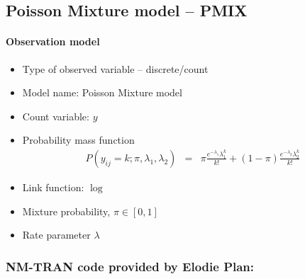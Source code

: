 \subsection{Poisson Mixture model -- PMIX}
\label{subsec:PMIX2model}

\paragraph{Observation model}

\begin{itemize}
\item
Type of observed variable -- discrete/count
\item
Model name: Poisson Mixture model
\item
Count variable: $y$
\item
Probability mass function
\begin{eqnarray}
P(y_{ij} = k;\pi,\lambda_1,\lambda_2) &=& \pi \frac{e^{-\lambda_1} \lambda_1^k}{k!} + (1-\pi) \frac{e^{-\lambda_2} \lambda_2^k}{k!} \nonumber
\end{eqnarray}
\item
Link function: $\log$
\item
Mixture probability, $\pi \in [0,1]$
\item
Rate parameter $\lambda$
\end{itemize}


\subsubsection{NM-TRAN code provided by Elodie Plan:}

\myStartLine

